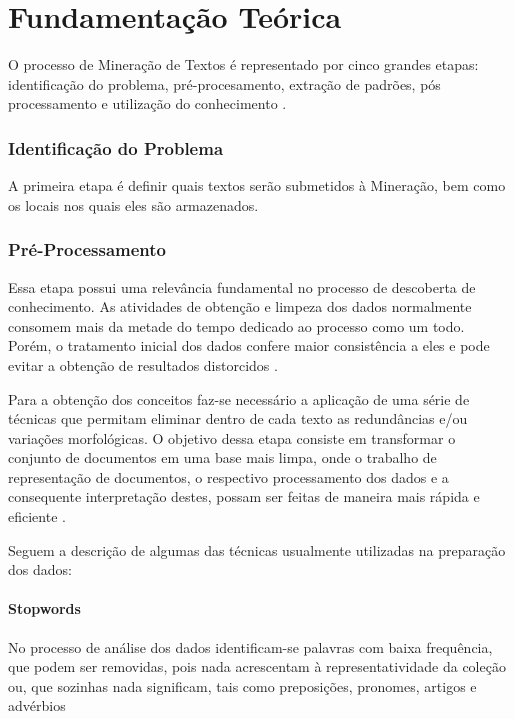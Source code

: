 \chapter{Fundamentação Teórica}

O processo de Mineração de Textos é representado por cinco grandes etapas: identificação do problema, pré-procesamento, extração de padrões, pós processamento e utilização do conhecimento \cite{rezende2011uso}.

\subsection{Identificação do Problema}

A primeira etapa é definir quais textos serão submetidos à Mineração, bem como os locais nos quais eles são armazenados.

\subsection{Pré-Processamento}

Essa etapa possui uma relevância fundamental no processo de descoberta de conhecimento. As atividades de obtenção e limpeza dos dados normalmente
consomem mais da metade do tempo dedicado ao processo como um todo. Porém, o tratamento inicial dos dados confere maior consistência a eles e pode evitar a obtenção de resultados distorcidos \cite{maria2012}.

Para a obtenção dos conceitos faz-se necessário a aplicação de uma série de técnicas que permitam eliminar dentro de cada texto as redundâncias e/ou variações morfológicas. O objetivo dessa etapa consiste em transformar o conjunto de documentos em uma base mais limpa, onde o trabalho de representação de documentos, o respectivo processamento dos dados e a consequente interpretação destes, possam ser feitas de maneira mais rápida e eficiente \cite{maria2012}.

Seguem a descrição de algumas das técnicas usualmente utilizadas na preparação dos dados:

\subsubsection{Stopwords}

No processo de análise dos dados identificam-se palavras com baixa frequência, que podem ser removidas, pois nada acrescentam à representatividade da coleção ou, que sozinhas nada significam, tais como preposições, pronomes, artigos e advérbios

